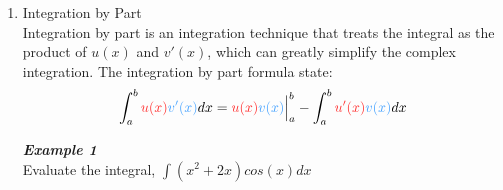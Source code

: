 \documentclass[12px]{article}
\begin{document}
\begin{enumerate}
\begin{multicols}{2}
        \\
        \\
        \\
        \\
        \textit{\textbf{Example 3}}\\
        Evaluate the integral, $\int sin^4x\ dx$\\
        \\
        \\
        \\
        \\
        \\
        \textit{\textbf{Exercise 1}}\\
        Evaluate the integral, $\int\frac{1}{cosx+3sinx}dx$\\
        \\
        \\
        \\
        \\
        \textit{\textbf{Exercise 2}}\\
        Evaluate the integral, $\int\frac{2sinx+cosx}{4cosx+sinx}dx$\\
        \\
        \\
        \\
        \\
        \textit{\textbf{Exercise 3}}\\
        Evaluate the integral, $\int cos^2x\ dx$\\
        \\
        \\
        \\
        \\
    \end{multicols}
    \newpage
    \item Integration by Part\\
    \hspace*{2em}Integration by part is an integration technique that treats the integral as the product of $u(x)$ and $v'(x)$, which can greatly simplify the complex integration. The integration by part formula state:
    $$\int_a^b{\color[rgb]{1,0.18,0.18}u(x)}{\color[rgb]{0.278,0.639,1}v'(x)}dx={\color[rgb]{1,0.18,0.18}u(x)}{\color[rgb]{0.278,0.639,1}v(x)}\Big |^b_a-\int_a^b {\color[rgb]{1,0.18,0.18}u'(x)}{\color[rgb]{0.278,0.639,1}v(x)}dx$$
    \begin{multicols}{2}
        \textit{\textbf{Example 1}}\\
        Evaluate the integral, $\int(x^2+2x)cos(x)dx$\\

\end{multicols}
\end{enumerate}
\end{document}
